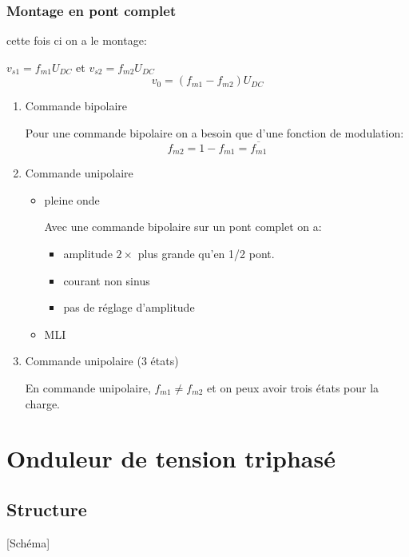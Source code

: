 \documentclass[main.tex]{subfiles}
\begin{document}
\subsubsection{Montage en pont complet}
cette fois ci on a le montage:
\begin{prop}
  $v_{s1} = f_{m1}U_{DC} $ et $v_{s2}= f_{m2} U_{DC} $
  \[
    v_0= (f_{m1}-f_{m2})U_{DC}
  \]
\end{prop}
\begin{enumerate}[label=\alph*)]
\item Commande bipolaire

  \begin{defin}
    Pour une commande bipolaire on a besoin que d'une fonction de modulation:
    \[
      f_{m2} = 1-f_{m1} = \overline{f_{m1}}
    \]
  \end{defin}
\item Commande unipolaire
  \begin{itemize}
  \item pleine onde

    \begin{prop}
      Avec une commande bipolaire sur un pont complet on a:
      \begin{itemize}
      \item amplitude $2\times$ plus grande qu'en 1/2 pont.
       \item courant non sinus
       \item pas de réglage d'amplitude
      \end{itemize}
    \end{prop}

  \item MLI
  \end{itemize}

\item Commande unipolaire (3 états)
  \begin{defin}
    En commande unipolaire, $f_{m1} \neq f_{m2}$ et on peux avoir trois états pour la charge.
  \end{defin}
\end{enumerate}


\section{Onduleur de tension triphasé}


\subsection{Structure}
[Schéma]
\end{document}
